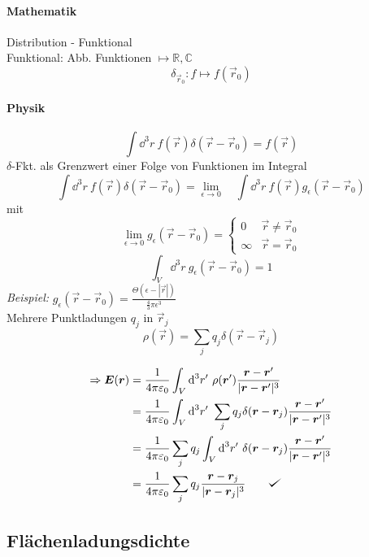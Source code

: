 \paragraph{Mathematik}
Distribution - Funktional\\[5pt]
Funktional: Abb. Funktionen $\mapsto \mathbb R, \mathbb C$
$$\delta_{\vec{r}_0}: f \mapsto f(\vec{r}_0)$$

\paragraph{Physik}

$$\int \dd^3 r\ f(\vec{r}) \delta (\vec{r}-\vec{r}_0) = f(\vec{r})$$
$\delta$-Fkt. als Grenzwert einer Folge von Funktionen im Integral
$$\int \dd^3 r\ f(\vec{r}) \delta (\vec{r} - \vec{r}_0) = \lim_{\epsilon \to 0} \quad \int \dd^3 r\ f(\vec{r}) g_\epsilon(\vec{r}-\vec{r}_0) $$
mit
$$\lim_{\epsilon \to 0} g_\epsilon (\vec{r}-\vec{r}_0) =  \left\{ \begin{array}{cc}
0 & \vec{r} \neq \vec{r}_0 \\
\infty & \vec{r} = \vec{r}_0
\end{array}\right.$$
$$\int_V \dd^3 r\ g_\epsilon (\vec{r}-\vec{r}_0) = 1$$
\emph{Beispiel:} $g_\epsilon (\vec{r}-\vec{r}_0) = \frac{\Theta(\epsilon - |\vec{r}|)}{\frac{4}{3}\pi \epsilon^3}$\\
Mehrere Punktladungen $q_j$ in $\vec{r}_j$
$$\rho(\vec{r}) = \sum_j q_j \delta(\vec{r}-\vec{r}_j)$$

\begin{align*}
 	\Rightarrow \vec{E}(\vec{r}) &= \kq \int_V \dd^3 r'\ \rho(\vec{r}') \frac{\vec{r} - \vec{r}'}{|\vec{r} - \vec{r}'|^3}\\
	&= \kq \int_V \dd^3 r'\ \sum_j q_j \delta(\vec{r} - \vec{r}_j) \frac{\vec{r} - \vec{r}'}{|\vec{r} - \vec{r}'|^3}\\
	&= \kq \sum_j q_j \int_V \dd^3 r'\ \delta(\vec{r} - \vec{r}_j) \frac{\vec{r} - \vec{r}'}{|\vec{r} - \vec{r}'|^3}\\
	&= \kq \sum_j q_j \frac{\vec{r} - \vec{r}_j}{|\vec{r} - \vec{r}_j|^3} \qquad \checkmark\\
\end{align*}

\subsection{Flächenladungsdichte}

